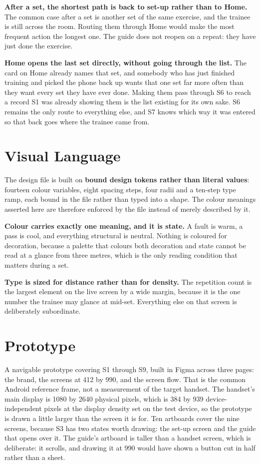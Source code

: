 \textbf{After a set, the shortest path is back to set-up rather than to Home.} The common case after a set is another set of the same exercise, and the trainee is still across the room. Routing them through Home would make the most frequent action the longest one. The guide does not reopen on a repeat: they have just done the exercise.

\textbf{Home opens the last set directly, without going through the list.} The card on Home already names that set, and somebody who has just finished training and picked the phone back up wants that one set far more often than they want every set they have ever done. Making them pass through S6 to reach a record S1 was already showing them is the list existing for its own sake. S6 remains the only route to everything else, and S7 knows which way it was entered so that back goes where the trainee came from.

\section{Visual Language}
\label{sec:8.4}

The design file is built on \textbf{bound design tokens rather than literal values}: fourteen colour variables, eight spacing steps, four radii and a ten-step type ramp, each bound in the file rather than typed into a shape. The colour meanings asserted here are therefore enforced by the file instead of merely described by it.

\textbf{Colour carries exactly one meaning, and it is state.} A fault is warm, a pass is cool, and everything structural is neutral. Nothing is coloured for decoration, because a palette that colours both decoration and state cannot be read at a glance from three metres, which is the only reading condition that matters during a set.

\textbf{Type is sized for distance rather than for density.} The repetition count is the largest element on the live screen by a wide margin, because it is the one number the trainee may glance at mid-set. Everything else on that screen is deliberately subordinate.

\section{Prototype}
\label{sec:8.5}

A navigable prototype covering S1 through S9, built in Figma across three pages: the brand, the screens at 412 by 990, and the screen flow. That is the common Android reference frame, not a measurement of the target handset. The handset's main display is 1080 by 2640 physical pixels, which is 384 by 939 device-independent pixels at the display density set on the test device, so the prototype is drawn a little larger than the screen it is for. Ten artboards cover the nine screens, because S3 has two states worth drawing: the set-up screen and the guide that opens over it. The guide's artboard is taller than a handset screen, which is deliberate: it scrolls, and drawing it at 990 would have shown a button cut in half rather than a sheet.

